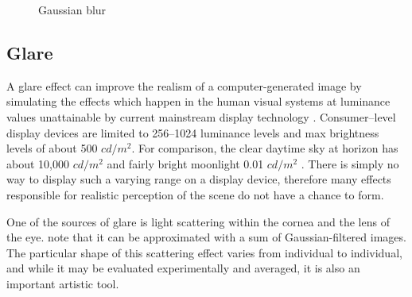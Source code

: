 \begin{figure}[h!]
  \centering
  \caption{Gaussian blur}
  \label{fig:postProcBlur}
\end{figure}

\subsection{Glare}

A glare effect can improve the realism of a computer-generated image by simulating the effects which happen in the human visual systems at luminance values unattainable by current mainstream display technology \cite{Spencer95physicallybasedglare}. Consumer--level display devices are limited to 256--1024 luminance levels and max brightness levels of about 500 $cd/m^2$. For comparison, the clear daytime sky at horizon has about 10,000 $cd/m^2$ and fairly bright moonlight 0.01 $cd/m^2$ \cite{radiometryPhotometry}. There is simply no way to display such a varying range on a display device, therefore many effects responsible for realistic perception of the scene do not have a chance to form.

One of the sources of glare is light scattering within the cornea and the lens of the eye. \citet{Spencer95physicallybasedglare} note that it can be approximated with a sum of Gaussian-filtered images. The particular shape of this scattering effect varies from individual to individual, and while it may be evaluated experimentally and averaged, it is also an important artistic tool.


